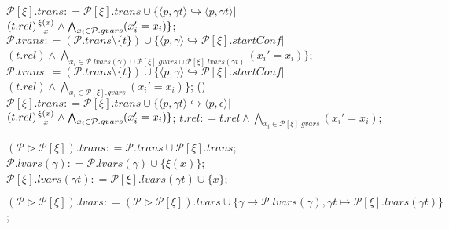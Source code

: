 \documentclass{llncs}
\begin{document}
\begin{algorithm}
{{{{            $\mathcal{P}[\xi].trans\mathrel{\mathop:}=\mathcal{P}[\xi].trans\cup\{\langle p,\gamma t\rangle\hookrightarrow\langle p,\gamma t\rangle
            |$\\
            \hspace*{2cm}$(t.rel){\xi(x)\atop x}\wedge\bigwedge_{x_i\in\mathcal{P}.gvars}(x_i'=x_i)\}$;\\
             {
                $\mathcal{P}.trans\mathrel{\mathop:}=(\mathcal{P}.trans\setminus\{t\})\cup\{\langle
                p,\gamma\rangle\hookrightarrow\mathcal{P}[\xi].startConf|$\\
                \hspace*{\fill}$(t.rel)\wedge\bigwedge_{x_i\in\mathcal{P}.lvars(\gamma)\cup\mathcal{P}[\xi].gvars\cup\mathcal{P}[\xi].lvars(\gamma t)}(x_i'=x_i)\}$;
            }
             {
                $\mathcal{P}.trans\mathrel{\mathop:}=(\mathcal{P}.trans\setminus\{t\})\cup\{\langle
                p,\gamma\rangle\hookrightarrow\mathcal{P}[\xi].startConf|$\\
                \hspace*{1.6cm}$(t.rel)\wedge\bigwedge_{x_i\in\mathcal{P}[\xi].gvars}(x_i'=x_i)\}$;
            }
        }
        \Else(){
            $\mathcal{P}[\xi].trans\mathrel{\mathop:}=\mathcal{P}[\xi].trans\cup\{\langle p,\gamma t\rangle\hookrightarrow\langle p,
            \epsilon\rangle|$\\
            \hspace*{2cm}$(t.rel){\xi(x)\atop x}\wedge\bigwedge_{x_i\in\mathcal{P}.gvars}(x_i'=x_i)\}$;
            $t.rel\mathrel{\mathop:}=t.rel\wedge\bigwedge_{x_i\in\mathcal{P}[\xi].gvars}(x_i'=x_i)$;
        }
    }
}

$(\mathcal{P}\vartriangleright\mathcal{P}[\xi]).trans\mathrel{\mathop:}=\mathcal{P}.trans\cup\mathcal{P}[\xi].trans$;\\
 {
     {
        $\mathcal{P}.lvars(\gamma)\mathrel{\mathop:}=\mathcal{P}.lvars(\gamma)\cup\{\xi(x)\}$;
        $\mathcal{P}[\xi].lvars(\gamma t)\mathrel{\mathop:}=\mathcal{P}[\xi].lvars(\gamma t)\cup\{x\}$;
    }
}

 {
    $(\mathcal{P}\vartriangleright\mathcal{P}[\xi]).lvars\mathrel{\mathop:}=(\mathcal{P}\vartriangleright\mathcal{P}[\xi]).lvars\cup\{\gamma\mapsto
    \mathcal{P}.lvars(\gamma), \gamma
    t\mapsto\mathcal{P}[\xi].lvars(\gamma t)\}$;

}

}
\end{algorithm}
\end{document}
